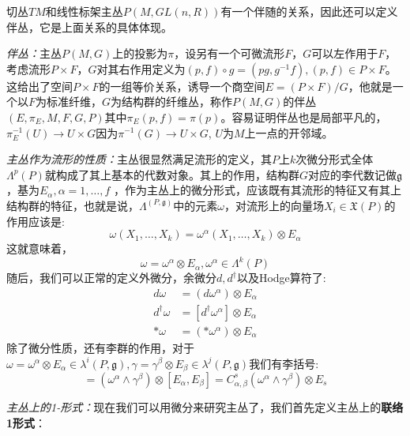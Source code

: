 \documentclass[supercite]{HustGraduPaper}
\begin{document}
\begin{appendices}
		切丛$TM$和线性标架主丛$P(M, GL(n,R))$有一个伴随的关系，因此还可以定义伴丛，它是上面关系的具体体现。
		
		\textit{伴丛：}主丛$P(M,G)$上的投影为$\pi$，设另有一个可微流形$F$，$G$可以左作用于$F$，考虑流形$P \times F$，$G$对其右作用定义为$(p,f)\circ g = (pg, g^{-1} f), (p,f) \in P \times F$。这给出了空间$P \times F$的一组等价关系，诱导一个商空间$E = (P \times F) /G$，他就是一个以$F$为标准纤维，$G$为结构群的纤维丛，称作$P(M,G)$的伴丛$(E,\pi_E,M,F,G,P)$其中$\pi_E (p,f) = \pi(p)$。容易证明伴丛也是局部平凡的，$\pi_E^{-1}(U) \to U \times G$因为$\pi^{-1}(G) \to U \times G$, $U$为$M$上一点的开邻域。
		
		
	   \textit{主丛作为流形的性质：}主丛很显然满足流形的定义，其$P$上$k$次微分形式全体$\Lambda^p (P)$就构成了其上基本的代数对象。其上的作用，结构群$G$对应的李代数记做$\mathfrak{g}$，基为$E_\alpha, \alpha= 1,\ldots,f$ ，作为主丛上的微分形式，应该既有其流形的特征又有其上结构群的特征，也就是说，$\Lambda^(P,\mathfrak{g})$中的元素$\omega$，对流形上的向量场$X_i \in \mathfrak{X}(P)$的作用应该是:
		\begin{equation}
		\omega(X_1,\ldots, X_k) = \omega^\alpha(X_1,\ldots, X_k) \otimes E_\alpha
		\end{equation}
		这就意味着，
		\begin{equation}
		\omega = \omega^\alpha \otimes E_\alpha, \omega^\alpha \in \Lambda^k(P)
		\end{equation}
		随后，我们可以正常的定义外微分，余微分$d,d^\dagger$以及Hodge算符了:
		\begin{equation}
		\begin{aligned}
		d\omega &= (d\omega^\alpha) \otimes E_\alpha \\
		d^\dagger \omega &= [d^\dagger \omega^\alpha]\otimes E_\alpha\\
		*\omega &= (*\omega^\alpha) \otimes  E_\alpha
		\end{aligned}
		\end{equation}
		除了微分性质，还有李群的作用，对于$\omega = \omega^\alpha \otimes E_\alpha \in \lambda^i(P,\mathfrak{g}), \gamma = \gamma^\beta \otimes E_\beta \in \lambda^j(P,\mathfrak{g})$我们有李括号:
		\begin{equation}
		[\omega, \gamma] = (\omega^\alpha \wedge \gamma^\beta) \otimes [E_\alpha, E_\beta] = C_{\alpha,\beta}^s (\omega^\alpha \wedge \gamma^\beta) \otimes E_s
		\end{equation}
		
		\textit{主丛上的1-形式：}现在我们可以用微分来研究主丛了，我们首先定义主丛上的\textbf{联络1形式}：
		

\end{appendices}
\end{document}
